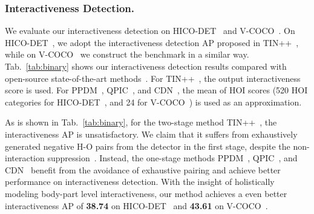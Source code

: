 \documentclass[runningheads]{llncs}
\begin{document}
\subsubsection{Interactiveness Detection.}
We evaluate our interactiveness detection on HICO-DET~\cite{hicodet} and V-COCO~\cite{vcoco}. On HICO-DET~\cite{hicodet}, we adopt the interactiveness detection AP proposed in TIN++~\cite{li2021transferable}, while on V-COCO~\cite{vcoco} we construct the benchmark in a similar way.
Tab.~\ref{tab:binary} shows our interactiveness detection results compared with open-source state-of-the-art methods~\cite{li2021transferable,ppdm,qpic,cdn}. For TIN++~\cite{li2021transferable}, the output interactiveness score is used. For PPDM~\cite{ppdm}, QPIC~\cite{qpic}, and CDN~\cite{cdn}, the mean of HOI scores (520 HOI categories for HICO-DET~\cite{hicodet}, and 24 for V-COCO~\cite{vcoco}) is used as an approximation.

\begin{table}
\centering
{}
\caption{Interactiveness detection results on HICO-DET~\cite{hicodet} and V-COCO~\cite{vcoco}.}
\label{tab:binary}
\end{table}

As is shown in Tab.~\ref{tab:binary}, for the two-stage method TIN++~\cite{li2021transferable}, the interactiveness AP is unsatisfactory. We claim that it suffers from exhaustively generated negative H-O pairs from the detector in the first stage, despite the non-interaction suppression~\cite{li2021transferable}. 
Instead, the one-stage methods PPDM~\cite{ppdm}, QPIC~\cite{qpic}, and CDN~\cite{cdn} benefit from the avoidance of exhaustive pairing and achieve better performance on interactiveness detection. 
With the insight of holistically modeling body-part level interactiveness, our method achieves a even better interactiveness AP of 
\textbf{38.74} on HICO-DET~\cite{hicodet} and \textbf{43.61} on V-COCO~\cite{vcoco}.
\end{document}
